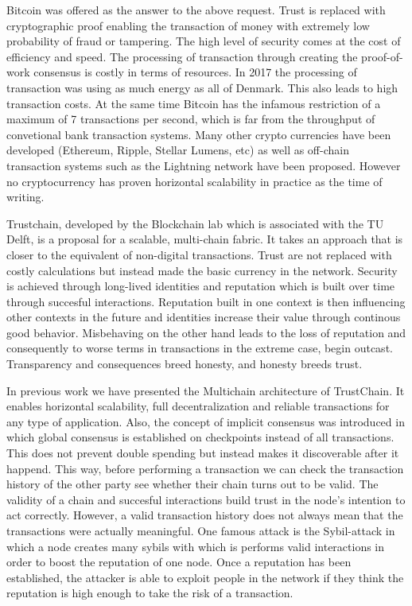 Bitcoin was offered as the answer to the above request. Trust is replaced with cryptographic
proof enabling the transaction of money with extremely low probability of fraud or tampering. 
The high level of security comes at the cost of efficiency and speed. The processing of 
transaction through creating the proof-of-work consensus is costly in terms of resources. In 
2017 the processing of transaction was using as much energy as all of Denmark. This also 
leads to high transaction costs. At the same time Bitcoin has the infamous restriction of
a maximum of 7 transactions per second, which is far from the throughput of convetional bank
transaction systems. Many other crypto currencies have been developed (Ethereum, Ripple, 
Stellar Lumens, etc) as well as off-chain transaction systems such as the Lightning network 
have been proposed. However no cryptocurrency has proven horizontal scalability in practice
as the time of writing.

Trustchain, developed by the Blockchain lab which is associated with the TU Delft,
is a proposal for a scalable, multi-chain fabric. It takes an approach that is closer to the equivalent
of non-digital transactions. Trust are not replaced with costly calculations but instead made 
the basic currency in the network. Security is achieved through long-lived identities and reputation
which is built over time through succesful interactions. Reputation built in one context is then 
influencing other contexts in the future and identities increase their value through continous
good behavior. Misbehaving on the other hand leads to the loss of reputation and consequently to
worse terms in transactions in the extreme case, begin outcast. Transparency and consequences breed 
honesty, and honesty breeds trust. 

In previous work we have presented the Multichain architecture of TrustChain. It enables horizontal scalability, full decentralization
and reliable transactions for any type of application. Also, the concept of implicit consensus was
introduced in which global consensus is established on checkpoints instead of all transactions. 
This does not prevent double spending but instead makes it discoverable after it happend. This
way, before performing a transaction we can check the transaction history of the other party 
see whether their chain turns out to be valid. The validity of a chain and succesful interactions build trust in the 
node's intention to act correctly. However, a valid transaction history does not 
always mean that the transactions were actually meaningful. One famous attack is the Sybil-attack in which a node creates many 
sybils with which is performs valid interactions in order to boost the reputation of one node. 
Once a reputation has been established, the attacker is able to exploit people in the network
if they think the reputation is high enough to take the risk of a transaction.


